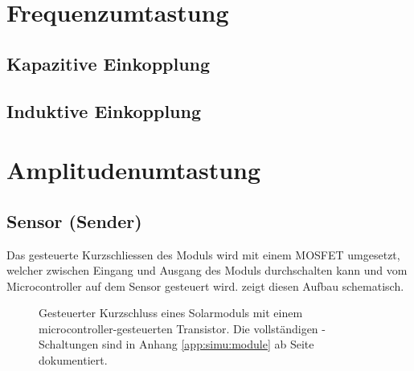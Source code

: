 
\section{Frequenzumtastung}
\label{sec:simu:fsk}

\subsection{Kapazitive Einkopplung}
\label{subsec:simu:fsk:coupling:capac}

\subsection{Induktive Einkopplung}
\label{subsec:simu:fsk:coupling:induct}

\section{Amplitudenumtastung}
\label{sec:simu:ask}

\subsection{Sensor (Sender)}
\label{subsec:simu:ask:sensor}

Das  gesteuerte Kurzschliessen  des Moduls  wird mit  einem MOSFET  umgesetzt,
welcher zwischen  Eingang und  Ausgang des Moduls  durchschalten kann  und vom
Microcontroller auf dem Sensor gesteuert wird. 
zeigt diesen Aufbau schematisch.

\begin{figure}[h!tb]
    \centering
    
    \caption{%
        Gesteuerter     Kurzschluss     eines    Solarmoduls     mit     einem
        microcontroller-gesteuerten       Transistor. Die      vollst\"andigen
        -Schaltungen  sind  in Anhang  \ref{app:simu:module}  ab
        Seite \pageref{app:simu:module} dokumentiert.%
    }
    \label{fig:module:mosfet:simple}
\end{figure}

